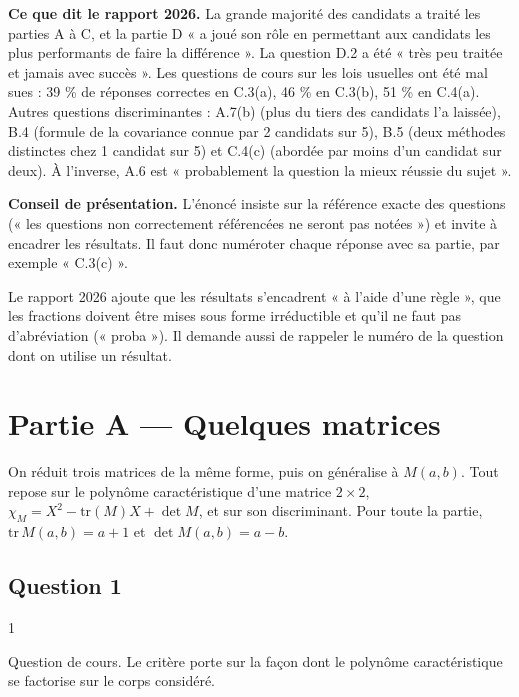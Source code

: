 \documentclass[11pt,a4paper]{article}
\begin{document}
\textbf{Ce que dit le rapport 2026.} La grande majorité des candidats a traité les parties A à C, et la partie D « a joué son rôle en permettant aux candidats les plus performants de faire la différence ». La question D.2 a été « très peu traitée et jamais avec succès ». Les questions de cours sur les lois usuelles ont été mal sues : 39 \% de réponses correctes en C.3(a), 46 \% en C.3(b), 51 \% en C.4(a). Autres questions discriminantes : A.7(b) (plus du tiers des candidats l'a laissée), B.4 (formule de la covariance connue par 2 candidats sur 5), B.5 (deux méthodes distinctes chez 1 candidat sur 5) et C.4(c) (abordée par moins d'un candidat sur deux). À l'inverse, A.6 est « probablement la question la mieux réussie du sujet ».

\textbf{Conseil de présentation.} L'énoncé insiste sur la référence exacte des questions (« les questions non correctement référencées ne seront pas notées ») et invite à encadrer les résultats. Il faut donc numéroter chaque réponse avec sa partie, par exemple « C.3(c) ».

Le rapport 2026 ajoute que les résultats s'encadrent « à l'aide d'une règle », que les fractions doivent être mises sous forme irréductible et qu'il ne faut pas d'abréviation (« proba »). Il demande aussi de rappeler le numéro de la question dont on utilise un résultat.

\hypertarget{partie-a-quelques-matrices}{%
\section{Partie A --- Quelques matrices}\label{partie-a-quelques-matrices}}

On réduit trois matrices de la même forme, puis on généralise à \(M(a,b)\). Tout repose sur le polynôme caractéristique d'une matrice \(2\times2\), \(\chi_M=X^2-\mathrm{tr}(M)X+\det M\), et sur son discriminant. Pour toute la partie, \(\mathrm{tr}\,M(a,b)=a+1\) et \(\det M(a,b)=a-b\).

\hypertarget{question-1}{%
\subsection{Question 1}\label{question-1}}

\begin{indication}{1}

Question de cours. Le critère porte sur la façon dont le polynôme caractéristique se factorise sur le corps considéré.

\end{indication}
\end{document}
